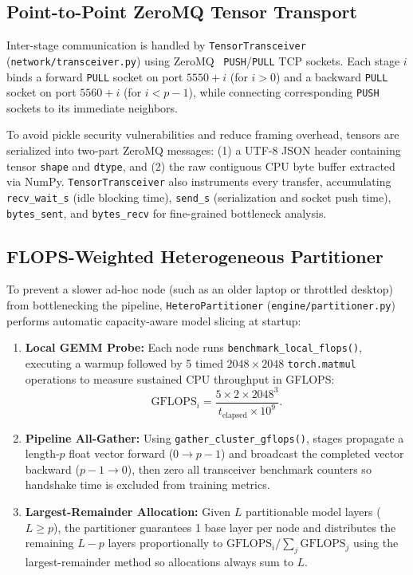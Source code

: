 \documentclass[conference]{IEEEtran}
\begin{document}
\subsection{Point-to-Point ZeroMQ Tensor Transport}
Inter-stage communication is handled by \texttt{TensorTransceiver} (\texttt{network/transceiver.py}) using ZeroMQ~\cite{zeromq} \texttt{PUSH}/\texttt{PULL} TCP sockets. Each stage $i$ binds a forward \texttt{PULL} socket on port $5550 + i$ (for $i > 0$) and a backward \texttt{PULL} socket on port $5560 + i$ (for $i < p - 1$), while connecting corresponding \texttt{PUSH} sockets to its immediate neighbors.

To avoid pickle security vulnerabilities and reduce framing overhead, tensors are serialized into two-part ZeroMQ messages: (1) a UTF-8 JSON header containing tensor \texttt{shape} and \texttt{dtype}, and (2) the raw contiguous CPU byte buffer extracted via NumPy. \texttt{TensorTransceiver} also instruments every transfer, accumulating \texttt{recv\_wait\_s} (idle blocking time), \texttt{send\_s} (serialization and socket push time), \texttt{bytes\_sent}, and \texttt{bytes\_recv} for fine-grained bottleneck analysis.

\subsection{FLOPS-Weighted Heterogeneous Partitioner}
To prevent a slower ad-hoc node (such as an older laptop or throttled desktop) from bottlenecking the pipeline, \texttt{HeteroPartitioner} (\texttt{engine/partitioner.py}) performs automatic capacity-aware model slicing at startup:
\begin{enumerate}
    \item \textbf{Local GEMM Probe:} Each node runs \texttt{benchmark\_local\_flops()}, executing a warmup followed by 5 timed $2048 \times 2048$ \texttt{torch.matmul} operations to measure sustained CPU throughput in GFLOPS:
    \begin{equation}
        \text{GFLOPS}_i = \frac{5 \times 2 \times 2048^3}{t_{\text{elapsed}} \times 10^9}.
    \end{equation}
    \item \textbf{Pipeline All-Gather:} Using \texttt{gather\_cluster\_gflops()}, stages propagate a length-$p$ float vector forward ($0 \rightarrow p-1$) and broadcast the completed vector backward ($p-1 \rightarrow 0$), then zero all transceiver benchmark counters so handshake time is excluded from training metrics.
    \item \textbf{Largest-Remainder Allocation:} Given $L$ partitionable model layers ($L \ge p$), the partitioner guarantees 1 base layer per node and distributes the remaining $L - p$ layers proportionally to $\text{GFLOPS}_i / \sum_j \text{GFLOPS}_j$ using the largest-remainder method so allocations always sum to $L$.
\end{enumerate}
\end{document}
